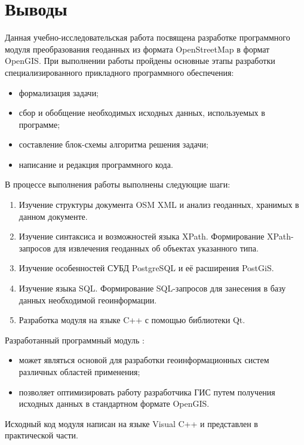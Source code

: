 \documentclass[12pt,a4paper,oneside]{article} %
\begin{document}
\section{Выводы}
Данная учебно-исследовательская работа посвящена разработке \linebreak
программного модуля преобразования геоданных из формата OpenStreetMap \linebreak
в формат OpenGIS. При выполнении работы пройдены основные этапы \linebreak
разработки специализированного прикладного программного обеспечения:
\begin{itemize}
\item формализация задачи;
\item сбор и обобщение необходимых исходных данных, используемых в \linebreak
программе;
\item составление блок-схемы алгоритма решения задачи;
\item написание и редакция программного кода.
\end{itemize}
В процессе выполнения работы выполнены следующие шаги:
\begin{enumerate}
\item Изучение структуры документа OSM XML и анализ геоданных, \linebreak
хранимых в данном документе.
\item Изучение синтаксиса и возможностей языка XPath. Формирование \linebreak
XPath-запросов для извлечения геоданных об объектах указанного типа.
\item Изучение особенностей СУБД PostgreSQL и её расширения PostGiS.
\item Изучение языка SQL. Формирование SQL-запросов для занесения в \linebreak
базу данных необходимой геоинформации.
\item Разработка модуля на языке C++ с помощью библиотеки Qt.
\end{enumerate}
Разработанный программный модуль :
\begin{itemize}
\item может являться основой для разработки геоинформационных систем \linebreak
различных областей применения;
\item позволяет оптимизировать работу разработчика ГИС путем получения \linebreak
исходных данных в стандартном формате OpenGIS.
\end{itemize}
Исходный код модуля написан на языке Visual C++ и представлен в \linebreak
практической части.
\end{document}
